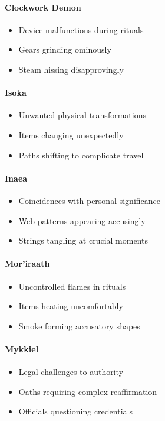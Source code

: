 \documentclass[12pt,twoside]{book}
\begin{document}
\paragraph{Clockwork Demon}
\begin{itemize}
\item Device malfunctions during rituals
\item Gears grinding ominously
\item Steam hissing disapprovingly
\end{itemize}

\paragraph{Isoka}
\begin{itemize}
\item Unwanted physical transformations
\item Items changing unexpectedly
\item Paths shifting to complicate travel
\end{itemize}

\paragraph{Inaea}
\begin{itemize}
\item Coincidences with personal significance
\item Web patterns appearing accusingly
\item Strings tangling at crucial moments
\end{itemize}

\paragraph{Mor'iraath}
\begin{itemize}
\item Uncontrolled flames in rituals
\item Items heating uncomfortably
\item Smoke forming accusatory shapes
\end{itemize}

\paragraph{Mykkiel}
\begin{itemize}
\item Legal challenges to authority
\item Oaths requiring complex reaffirmation
\item Officials questioning credentials
\end{itemize}
\end{document}
